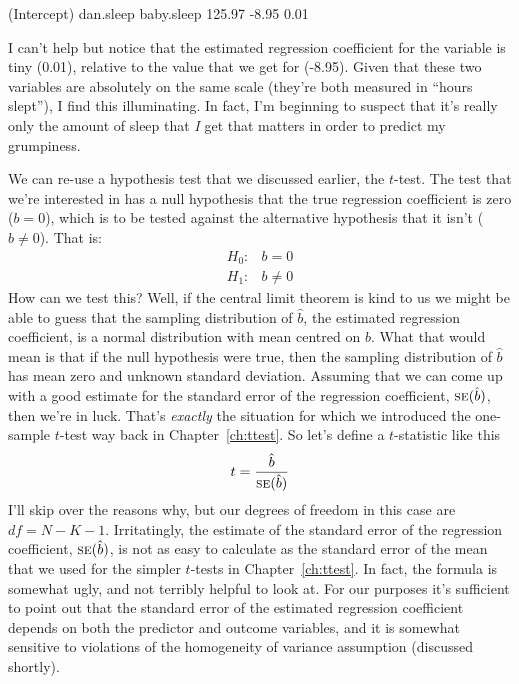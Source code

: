 \begin{rblock1}
(Intercept)    dan.sleep   baby.sleep  
  125.97        -8.95        0.01  
\end{rblock1}

I can't help but notice that the estimated regression coefficient for the  variable is tiny (0.01), relative to the value that we get for  (-8.95). Given that these two variables are absolutely on the same scale (they're both measured in ``hours slept''), I find this illuminating. In fact, I'm beginning to suspect that it's really only the amount of sleep that {\it I} get that matters in order to predict my grumpiness.

We can re-use a hypothesis test that we discussed earlier, the $t$-test. The test that we're interested in has a null hypothesis that the true regression coefficient is zero ($b = 0$), which is to be tested against the alternative hypothesis that it isn't ($b \neq 0$). That is:
$$
\begin{array}{rl}
H_0: & b = 0 \\
H_1: & b \neq 0 
\end{array}
$$
How can we test this? Well, if the central limit theorem is kind to us we might be able to guess that the sampling distribution of $\hat{b}$, the estimated regression coefficient, is a normal distribution with mean centred on $b$. What that would mean is that if the null hypothesis were true, then the sampling distribution of $\hat{b}$ has mean zero and unknown standard deviation. Assuming that we can come up with a good estimate for the standard error of the regression coefficient, $\mbox{\textsc{se}}(\hat{b})$, then we're in luck. That's {\it exactly} the situation for which we introduced the one-sample $t$-test way back in Chapter~\ref{ch:ttest}. So let's define a $t$-statistic like this
$$
t = \frac{\hat{b}}{\mbox{\textsc{se}}(\hat{b})}
$$
I'll skip over the reasons why, but our degrees of freedom in this case are $df = N- K- 1$. Irritatingly, the estimate of the standard error of the regression coefficient, $\mbox{\textsc{se}}(\hat{b})$, is not as easy to calculate as the standard error of the mean that we used for the simpler $t$-tests in Chapter~\ref{ch:ttest}. In fact, the formula is somewhat ugly, and not terribly helpful to look at. For our purposes it's sufficient to point out that the standard error of the  estimated regression coefficient depends on both the predictor and outcome variables, and it is somewhat sensitive to violations of the homogeneity of variance assumption (discussed shortly). 


